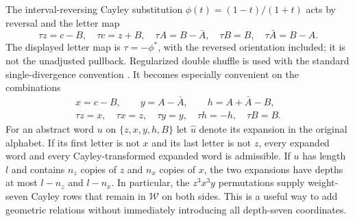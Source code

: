 The interval-reversing Cayley substitution $\phi(t)=(1-t)/(1+t)$
acts by reversal and the
letter map
\[
 \tau z=c-B,\quad \tau c=z+B,\quad
 \tau A=B-\bar A,\quad \tau B=B,\quad
 \tau\bar A=B-A.
\]
The displayed letter map is $\tau=-\phi^*$, with the reversed
orientation included; it is not the unadjusted pullback. Regularized
double shuffle is used with the standard single-divergence convention
\cite{zhao,racinet}.
It becomes especially convenient on the combinations
\begin{gather*}
 x=c-B,\qquad y=A-\bar A,\qquad h=A+\bar A-B,\\
 \tau z=x,\quad\tau x=z,\quad\tau y=y,\quad
 \tau h=-h,\quad\tau B=B.
\end{gather*}
For an abstract word $u$ on $\{z,x,y,h,B\}$ let $\widehat u$ denote
its expansion in the original alphabet. If its first letter is not
$x$ and its last letter is not $z$, every expanded word and every
Cayley-transformed expanded word is admissible. If $u$ has length $l$
and contains $n_z$ copies of $z$ and $n_x$ copies of $x$, the two
expansions have depths at most $l-n_z$ and $l-n_x$. In particular,
the $z^3x^3y$ permutations supply weight-seven Cayley rows that remain
in $\mathcal W$ on both sides. This is a useful way to add geometric
relations without immediately introducing all depth-seven coordinates.

